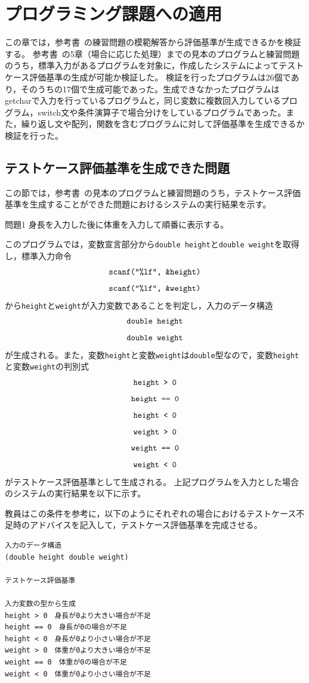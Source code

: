 \documentclass{tpu-sotu}
\begin{document}
\chapter{プログラミング課題への適用}
この章では，参考書~\cite{b1}の練習問題の模範解答から評価基準が生成できるかを検証する。
参考書~\cite{b1}の5章（場合に応じた処理）までの見本のプログラムと練習問題のうち，標準入力があるプログラムを対象に，作成したシステムによってテストケース評価基準の生成が可能か検証した。
検証を行ったプログラムは26個であり，そのうちの17個で生成可能であった。生成できなかったプログラムはgetcharで入力を行っているプログラムと，同じ変数に複数回入力しているプログラム，switch文や条件演算子で場合分けをしているプログラムであった。また，繰り返し文や配列，関数を含むプログラムに対して評価基準を生成できるか検証を行った。

\section{テストケース評価基準を生成できた問題}
この節では，参考書~\cite{b1}の見本のプログラムと練習問題のうち，テストケース評価基準を生成することができた問題におけるシステムの実行結果を示す。
\begin{itembox}[l]{問題1}
身長を入力した後に体重を入力して順番に表示する。
\end{itembox}

このプログラムでは，変数宣言部分から{\tt double height}と{\tt double weight}を取得し，標準入力命令\\
\[ 
\mbox{{\tt {scanf("\%lf", \&height)}}}
\]
\[ 
\mbox{{\tt {scanf("\%lf", \&weight)}}}
\]
から{\tt height}と{\tt weight}が入力変数であることを判定し，入力のデータ構造\\
\[
\mbox{{\tt double height}}
\]
\[
\mbox{{\tt double weight}}
\]
が生成される。また，変数{\tt height}と変数{\tt weight}は{\tt double}型なので，変数{\tt height}と変数{\tt weight}の判別式\\
\[ 
\mbox{\tt{height > 0}} 
\]
\[
\mbox{\tt{height == 0}}
\]
\[
\mbox{\tt{height < 0}}
\]
\[ 
\mbox{\tt{weight > 0}} 
\]
\[
\mbox{\tt{weight == 0}}
\]
\[
\mbox{\tt{weight < 0}}
\]
がテストケース評価基準として生成される。
上記プログラムを入力とした場合のシステムの実行結果を以下に示す。

教員はこの条件を参考に，以下のようにそれぞれの場合におけるテストケース不足時のアドバイスを記入して，テストケース評価基準を完成させる。
\begin{lstlisting}[xleftmargin=1cm]
入力のデータ構造
(double height double weight)

テストケース評価基準

入力変数の型から生成
height > 0　身長が0より大きい場合が不足
height == 0　身長が0の場合が不足
height < 0　身長が0より小さい場合が不足
weight > 0　体重が0より大きい場合が不足
weight == 0　体重が0の場合が不足
weight < 0　体重が0より小さい場合が不足
\end{lstlisting}
\end{document}
